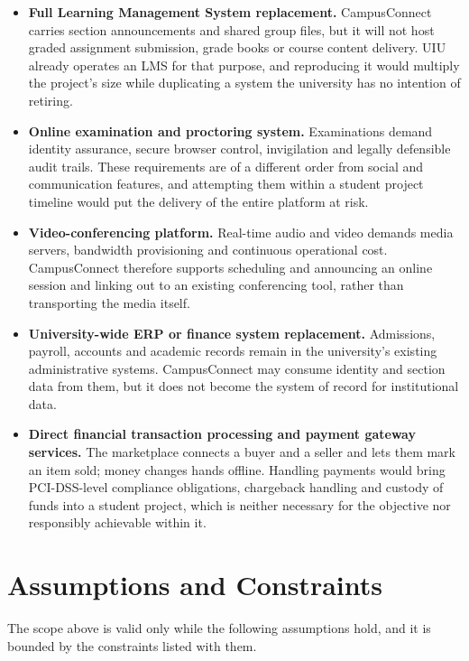 \documentclass[11pt,a4paper]{report}
\begin{document}
\begin{itemize}
  \item \textbf{Full Learning Management System replacement.} CampusConnect
  carries section announcements and shared group files, but it will not host
  graded assignment submission, grade books or course content delivery. UIU
  already operates an LMS for that purpose, and reproducing it would multiply
  the project's size while duplicating a system the university has no intention
  of retiring.

  \item \textbf{Online examination and proctoring system.} Examinations demand
  identity assurance, secure browser control, invigilation and legally
  defensible audit trails. These requirements are of a different order from
  social and communication features, and attempting them within a student
  project timeline would put the delivery of the entire platform at risk.

  \item \textbf{Video-conferencing platform.} Real-time audio and video demands
  media servers, bandwidth provisioning and continuous operational cost.
  CampusConnect therefore supports scheduling and announcing an online session
  and linking out to an existing conferencing tool, rather than transporting the
  media itself.

  \item \textbf{University-wide ERP or finance system replacement.} Admissions,
  payroll, accounts and academic records remain in the university's existing
  administrative systems. CampusConnect may consume identity and section data
  from them, but it does not become the system of record for institutional data.

  \item \textbf{Direct financial transaction processing and payment gateway
  services.} The marketplace connects a buyer and a seller and lets them mark an
  item sold; money changes hands offline. Handling payments would bring
  PCI-DSS-level compliance obligations, chargeback handling and custody of funds
  into a student project, which is neither necessary for the objective nor
  responsibly achievable within it.
\end{itemize}

\section{Assumptions and Constraints}

The scope above is valid only while the following assumptions hold, and it is
bounded by the constraints listed with them.
\end{document}
